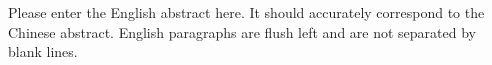 Please enter the English abstract here. It should accurately correspond to the Chinese abstract. English paragraphs are flush left and are not separated by blank lines.
